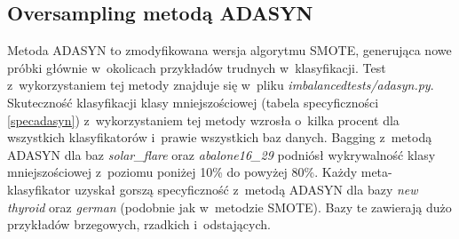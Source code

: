 \subsection{Oversampling metodą ADASYN}
Metoda ADASYN to zmodyfikowana wersja algorytmu SMOTE, generująca nowe próbki głównie w~okolicach przykładów trudnych w~klasyfikacji. Test z~wykorzystaniem tej metody znajduje się w~pliku \textit{imbalancedtests/adasyn.py}. Skuteczność klasyfikacji klasy mniejszościowej (tabela specyficzności \ref{specadasyn}) z~wykorzystaniem tej metody wzrosła o~kilka procent dla wszystkich klasyfikatorów i~prawie wszystkich baz danych. Bagging z~metodą ADASYN dla baz \textit{solar\_flare} oraz \textit{abalone16\_29} podniósł wykrywalność klasy mniejszościowej z~poziomu poniżej 10\% do powyżej 80\%. Każdy meta-klasyfikator uzyskał gorszą specyficzność z~metodą ADASYN dla bazy \textit{new thyroid} oraz \textit{german} (podobnie jak w~metodzie SMOTE). Bazy te zawierają dużo przykładów brzegowych, rzadkich i~odstających. 
